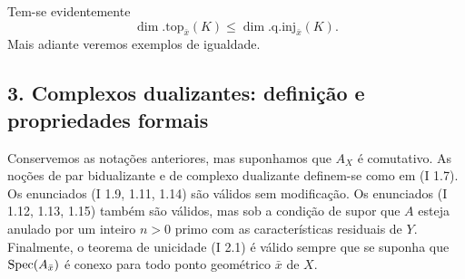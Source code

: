 Tem-se evidentemente
\[
        \dim.\mathrm{top}_{\bar{x}}(K)\leq \dim.\mathrm{q.inj}_{\bar{x}}(K).
\]
Mais adiante veremos exemplos de igualdade.

\subsection*{3. Complexos dualizantes: definição e propriedades formais}

Conservemos as notações anteriores, mas suponhamos que $A_X$ é comutativo. As noções de par bidualizante e de complexo dualizante definem-se como em (I 1.7). Os enunciados (I 1.9, 1.11, 1.14) são válidos sem modificação. Os enunciados (I 1.12, 1.13, 1.15) também são válidos, mas sob a condição de supor que $A$ esteja anulado por um inteiro $n>0$ primo com as características residuais de $Y$. Finalmente, o teorema de unicidade (I 2.1) é válido sempre que se suponha que $\operatorname{Spec}(A_{\bar{x}})$ é conexo para todo ponto geométrico $\bar{x}$ de $X$.
